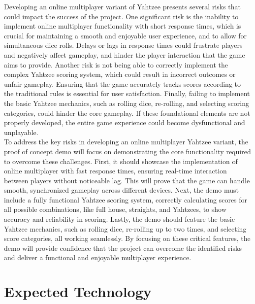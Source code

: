 \documentclass{article}
\begin{document}
Developing an online multiplayer variant of Yahtzee presents several risks that could impact the success of the project. One significant risk is the inability to implement online multiplayer functionality with short response times, which is crucial for maintaining a smooth and enjoyable user experience, and to allow for simultaneous dice rolls. Delays or lags in response times could frustrate players and negatively affect gameplay, and hinder the player interaction that the game aims to provide. Another risk is not being able to correctly implement the complex Yahtzee scoring system, which could result in incorrect outcomes or unfair gameplay. Ensuring that the game accurately tracks scores according to the traditional rules is essential for user satisfaction. Finally, failing to implement the basic Yahtzee mechanics, such as rolling dice, re-rolling, and selecting scoring categories, could hinder the core gameplay. If these foundational elements are not properly developed, the entire game experience could become dysfunctional and unplayable. \\

To address the key risks in developing an online multiplayer Yahtzee variant, the proof of concept demo will focus on demonstrating the core functionality required to overcome these challenges. First, it should showcase the implementation of online multiplayer with fast response times, ensuring real-time interaction between players without noticeable lag. This will prove that the game can handle smooth, synchronized gameplay across different devices. Next, the demo must include a fully functional Yahtzee scoring system, correctly calculating scores for all possible combinations, like full house, straights, and Yahtzees, to show accuracy and reliability in scoring. Lastly, the demo should feature the basic Yahtzee mechanics, such as rolling dice, re-rolling up to two times, and selecting score categories, all working seamlessly. By focusing on these critical features, the demo will provide confidence that the project can overcome the identified risks and deliver a functional and enjoyable multiplayer experience.\\

\section{Expected Technology}

\end{document}
